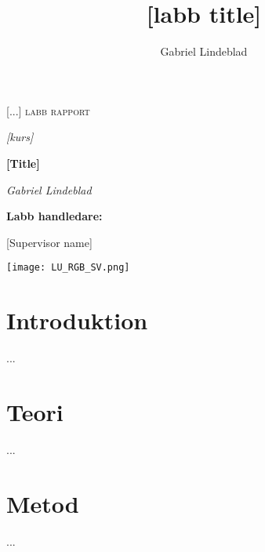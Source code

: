 \documentclass{article}
\title{[labb title]}
\author{Gabriel Lindeblad} %
\begin{document}
\begin{titlepage}

    \vspace*{2.5cm}
	\centering
	{\huge \textsc{[...] labb rapport} \par}
    \vspace{0.1cm}
    {\large\itshape [kurs] \par}
	\vspace{0.5cm}
	{\Huge\bfseries [Title]\par}
	\vspace{1cm}
	{\Large\itshape Gabriel Lindeblad \par} %
	\vfill

	\Large{\bfseries Labb handledare:\par } [Supervisor name]

	\vfill

    \vspace{1.5cm}
    \texttt{[image: LU\_RGB\_SV.png]} %
    \vspace*{0.5cm}

\end{titlepage}

\tableofcontents
\newpage


\section{Introduktion}\label{sec:Introduktion}
...


\section{Teori}\label{sec:Teori}
...


\section{Metod}\label{sec:Metod}
...
\end{document}
